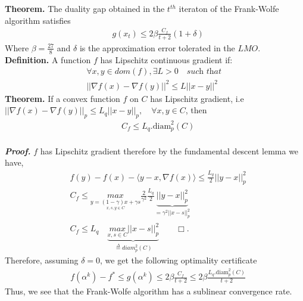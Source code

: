 \textbf{Theorem.} The duality gap obtained in the $t^{th}$  iteraton of the Frank-Wolfe algorithm satisfies
\begin{equation*}
\begin{aligned}
    &g(x_{t})\leq 2\beta\frac{C_{f}}{t+2}(1+\delta)
\end{aligned}
\end{equation*}
Where $\beta= \frac{27}{8}$ and $\delta$ is the approximation error tolerated in the $LMO$. \\

\textbf{Definition.} A function $f$ has Lipschitz continuous gradient if:
\begin{equation*}
\begin{aligned}
    &\forall x,y \in dom(f), \exists L >0 \quad\textit{such that}\quad\\
    &||\nabla f(x) -\nabla f(y)||^2 \leq L||x - y||^2
\end{aligned}
\end{equation*}
\textbf{Theorem.} If a convex function $f$ on $C$ has Lipschitz gradient, i.e $||\nabla f(x)- \nabla f(y)||_{p}\leq L_{q}||x- y||_{p},\quad\forall x,y\in C$, then
\begin{equation*}
\begin{aligned}
      &C_{f}\leq L_{q}.\text{diam}_{p}^{2}(C)
\end{aligned}
\end{equation*} \\

\textbf{\textit{Proof.}} $f$ has Lipschitz gradient therefore by the fundamental descent lemma we have,
\begin{equation*}
\begin{aligned}
      &f(y)- f(x)- \langle y- x, \nabla f(x)\rangle \leq \frac{L_{q}}{2}||y- x||_{p}^{2}\\
      &C_{f} \leq \underset{\underset{x,s,y\in C}{y=(1-\gamma)x+\gamma s}}{max}\frac{2}{\gamma^{2}}\frac{L_{q}}{2}\underbrace{||y- x||_{p}^{2}}_{=\gamma^{2}||x- s||_{p}^{2}}\\
      &C_{f} \leq L_{q}\quad\underbrace{\underset{x,s\in C}{max}||x- s||_{p}^{2}}_{\overset{\Delta}{=}\textit{diam}_{p}^{2}(C)}\quad\quad\Box.
\end{aligned}
\end{equation*}
Therefore, assuming $\delta=0$, we get the following optimality certificate
\begin{equation*}
\begin{aligned}
      &f(\alpha^{k})- f^{*}\leq  g(\alpha^{k})\leq 2\beta\frac{C_{f}}{t+2}\leq 2\beta\frac{L_{q}.\text{diam}_{p}^{2}(C)}{t+2}
\end{aligned}
\end{equation*}
Thus, we see that the Frank-Wolfe algorithm has a sublinear convergence rate.
